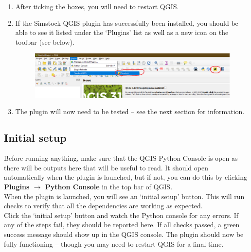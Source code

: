 \documentclass{article}
\begin{document}
\begin{enumerate}
    \item After ticking the boxes, you will need to restart QGIS.
    
    \item If the Simstock QGIS plugin has successfully been installed, you should be able to see it listed under the `Plugins' list as well as a new icon on the toolbar (see below).
    \begin{figure}[h!]
        \centering
        \includegraphics[width=16cm]{installed.png}
        \label{fig:installed}
    \end{figure}
    
    \item The plugin will now need to be tested -- see the next section for information.
\end{enumerate}

\subsection{Initial setup}
Before running anything, make sure that the QGIS Python Console is open as there will be outputs here that will be useful to read. It should open automatically when the plugin is launched, but if not, you can do this by clicking \textbf{Plugins $\rightarrow$ Python Console} in the top bar of QGIS. \\

When the plugin is launched, you will see an `initial setup' button. This will run checks to verify that all the dependencies are working as expected. \\

Click the `initial setup' button and watch the Python console for any errors. If any of the steps fail, they should be reported here. If all checks passed, a green success message should show up in the QGIS console. The plugin should now be fully functioning -- though you may need to restart QGIS for a final time.

\end{document}
